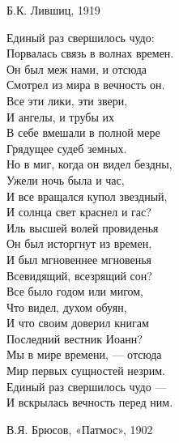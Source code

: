 \begin{multicols}{2}
        \begin{center}
        Б.К. Лившиц, 1919 
        \end{center}
    \columnbreak
        \noindent
        Единый раз свершилось чудо: \\
        Порвалась связь в волнах времен. \\
        Он был меж нами, и отсюда \\
        Смотрел из мира в вечность он. \\
        Все эти лики, эти звери, \\
        И ангелы, и трубы их \\
        В себе вмешали в полной мере \\
        Грядущее судеб земных. \\
        Но в миг, когда он видел бездны, \\
        Ужели ночь была и час, \\
        И все вращался купол звездный, \\
        И солнца свет краснел и гас? \\
        Иль высшей волей провиденья \\
        Он был исторгнут из времен, \\
        И был мгновеннее мгновенья \\
        Всевидящий, всезрящий сон? \\
        Все было годом или мигом, \\
        Что видел, духом обуян, \\
        И что своим доверил книгам \\
        Последний вестник Иоанн? \\
        Мы в мире времени, — отсюда \\
        Мир первых сущностей незрим. \\
        Единый раз свершилось чудо — \\
        И вскрылась вечность перед ним. \\
        
        \begin{center}
        В.Я. Брюсов, «Патмос», 1902
        \end{center}
    \end{multicols}
    

        
    

        

